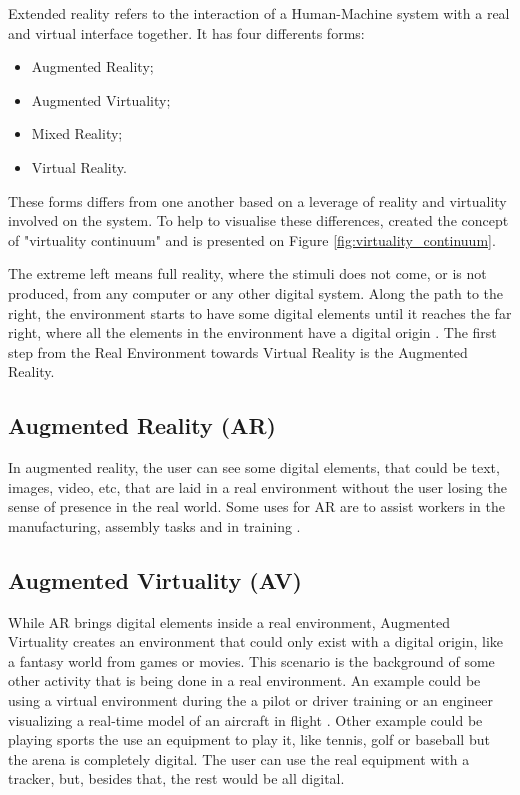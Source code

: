 Extended reality refers to the interaction of a Human-Machine system with a real and virtual interface together. It has four differents forms:
\begin{itemize}
    \item Augmented Reality;
    \item Augmented Virtuality;
    \item Mixed Reality;
    \item Virtual Reality.
\end{itemize}

These forms differs from one another based on a leverage of reality and virtuality involved on the system. To help to visualise these differences,  created the concept of "virtuality continuum" and is presented on Figure \ref{fig:virtuality_continuum}. 



The extreme left means full reality, where the stimuli does not come, or is not produced, from any computer or any other digital system. Along the path to the right, the environment starts to have some digital elements until it reaches the far right, where all the elements in the environment have a digital origin \cite{nijholt2005virtuality, doolani2020review}. The first step from the Real Environment towards Virtual Reality is the Augmented Reality.

\subsection{Augmented Reality (AR)}
\label{subsec:augmented_reality}

    In augmented reality, the user can see some digital elements, that could be text, images, video, etc, that are laid in a real environment without the user losing the sense of presence in the real world. Some uses for AR are to assist workers in the manufacturing, assembly tasks and in training \cite{doolani2020review, farrell2018learning, ma2007virtuality}.

\subsection{Augmented Virtuality (AV)}
\label{subsec:augmented_virtuality}
    
    While AR brings digital elements inside a real environment, Augmented Virtuality creates an environment that could only exist with a digital origin, like a fantasy world from games or movies. This scenario is the background of some other activity that is being done in a real environment. An example could be using a virtual environment during the a pilot or driver training or an engineer visualizing a real-time model of an aircraft in flight \cite{farshid2018go}. Other example could be playing sports the use an equipment to play it, like tennis, golf or baseball but the arena is completely digital. The user can use the real equipment with a tracker, but, besides that, the rest would be all digital.

